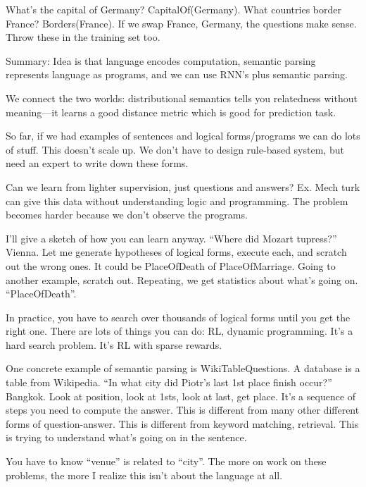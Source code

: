 What's the capital of Germany? CapitalOf(Germany). What countries border France? Borders(France). If we swap France, Germany, the questions make sense. Throw these in the training set too.

Summary: Idea is that language encodes computation, semantic parsing represents language as programs, and we can use RNN's plus semantic parsing.

We connect the two worlds: distributional semantics tells you relatedness without meaning---it learns a good distance metric which is good for prediction task. 

So far, if we had examples of sentences and logical forms/programs we can do lots of stuff. This doesn't scale up. We don't have to design rule-based system, but need an expert to write down these forms. 

Can we learn from lighter supervision, just questions and answers? Ex. Mech turk can give this data without understanding logic and programming. The problem becomes harder because we don't observe the programs. 

I'll give a sketch of how you can learn anyway. ``Where did Mozart tupress?'' Vienna. Let me generate hypotheses of logical forms, execute each, and scratch out the wrong ones. It could be PlaceOfDeath of PlaceOfMarriage. Going to another example, scratch out. Repeating, we get statistics about what's going on. ``PlaceOfDeath''.

In practice, you have to search over thousands of logical forms until you get the right one. There are lots of things you can do: RL, dynamic programming. It's a hard search problem. It's RL with sparse rewards.

One concrete example of semantic parsing is WikiTableQuestions. A database is a table from Wikipedia. ``In what city did Piotr's last 1st place finish occur?'' Bangkok. Look at position, look at 1sts, look at last, get place. It's a sequence of steps you need to compute the answer. This is different from many other different forms of question-answer. This is different from keyword matching, retrieval. This is trying to understand what's going on in the sentence.

You have to know ``venue'' is related to ``city''. 
The more on work on these problems, the more I realize this isn't about the language at all.

